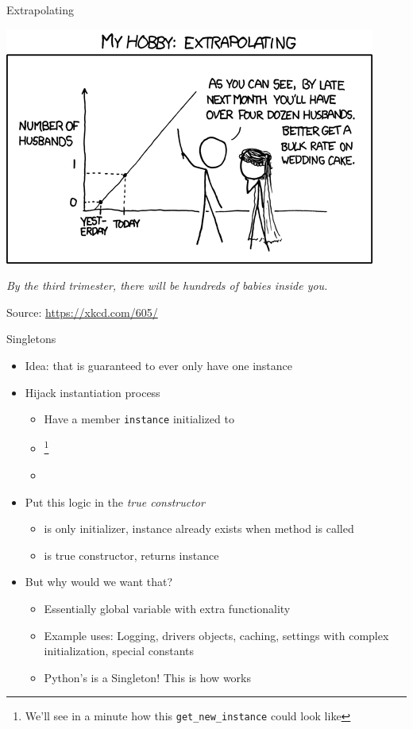 
\begin{frame}{Extrapolating}
%
\begin{center}
	\includegraphics[width=.5\linewidth]{./gfx/13-xkcd-extrapolating}
\end{center}
%
\begin{center}
	\emph{By the third trimester, there will be hundreds of babies inside you.}

	\vspace{6pt}
	Source: \url{https://xkcd.com/605/}
\end{center}
%
\end{frame}


\begin{frame}{Singletons}
%
\begin{itemize}
\item Idea:  that is guaranteed to ever only have one instance
\item Hijack instantiation process
	\begin{itemize}
	\item Have a  member \texttt{instance} initialized to 
	\item {}\footnote{%
		We'll see in a minute how this \texttt{get\_new\_instance} could look like}
	\item {}
	\end{itemize}
\item Put this logic in the \emph{true constructor}
	\begin{itemize}
	\item {} is only initializer, \ie instance already exists when method is called
	\item {} is true constructor, returns instance
	\end{itemize}
\item But why would we want that?
	\begin{itemize}
	\item Essentially global variable with extra functionality
	\item Example uses: Logging, drivers objects, caching, settings with complex initialization, special constants
	\item Python's  is a Singleton! \Thus This is how  works
	\end{itemize}
\end{itemize}
%
\end{frame}

